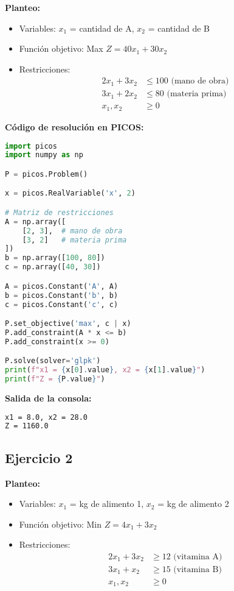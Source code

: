 \documentclass[12pt]{article}
\begin{document}
\textbf{Planteo:}
\begin{itemize}
\item Variables: $x_1$ = cantidad de A, $x_2$ = cantidad de B
\item Función objetivo: Max $Z = 40x_1 + 30x_2$
\item Restricciones:
  \begin{align*}
  2x_1 + 3x_2 &\leq 100 \text{ (mano de obra)} \\
  3x_1 + 2x_2 &\leq 80 \text{ (materia prima)} \\
  x_1, x_2 &\geq 0
  \end{align*}
\end{itemize}

\textbf{Código de resolución en PICOS:}
\begin{lstlisting}[language=Python]
import picos
import numpy as np

P = picos.Problem()

x = picos.RealVariable('x', 2)

# Matriz de restricciones
A = np.array([
    [2, 3],  # mano de obra
    [3, 2]   # materia prima
])
b = np.array([100, 80])
c = np.array([40, 30])

A = picos.Constant('A', A)
b = picos.Constant('b', b)
c = picos.Constant('c', c)

P.set_objective('max', c | x)
P.add_constraint(A * x <= b)
P.add_constraint(x >= 0)

P.solve(solver='glpk')
print(f"x1 = {x[0].value}, x2 = {x[1].value}")
print(f"Z = {P.value}")
\end{lstlisting}

\textbf{Salida de la consola:}
\begin{lstlisting}[language=bash,backgroundcolor=\color{black},basicstyle=\color{white}\ttfamily,numbers=none]
x1 = 8.0, x2 = 28.0
Z = 1160.0
\end{lstlisting}

\subsection*{Ejercicio 2}

\textbf{Planteo:}
\begin{itemize}
\item Variables: $x_1$ = kg de alimento 1, $x_2$ = kg de alimento 2
\item Función objetivo: Min $Z = 4x_1 + 3x_2$
\item Restricciones:
  \begin{align*}
  2x_1 + 3x_2 &\geq 12 \text{ (vitamina A)} \\
  3x_1 + x_2 &\geq 15 \text{ (vitamina B)} \\
  x_1, x_2 &\geq 0
  \end{align*}
\end{itemize}
\end{document}
